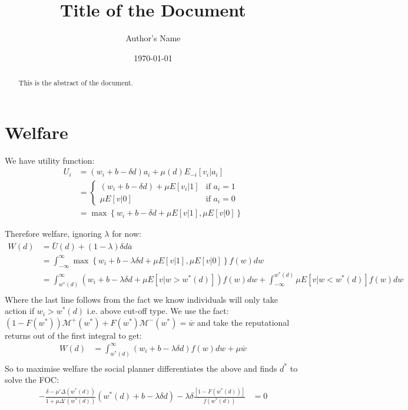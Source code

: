 \documentclass{article}
\begin{document}
\title{Title of the Document}
\author{Author's Name}
\date{\today}

\maketitle

\begin{abstract}
This is the abstract of the document.
\end{abstract}

\section{Welfare}
We have utility function:
\begin{align*}
    U_i &= (w_i + b - \delta d) a_i + \mu(d) E_{-i}\left[v_i | a_i\right] \\
    &= \begin{cases}
        (w_i + b- \delta d) + \mu E \left[v_i | 1\right] & \text{if } a_i = 1 \\
        \mu E \left[v | 0\right] & \text{if } a_i = 0
    \end{cases} \\
    &= \max \left\{w_i + b - \delta d + \mu E\left[v | 1\right],
    \mu E\left[v | 0\right]
      \right\} 
\end{align*}

Therefore welfare, ignoring $\lambda$ for now:
\begin{align*}
    W(d) &= \bar{U}(d) + (1 - \lambda) \delta d \overline{a} \\
    &= \int_{-\infty}^{\infty} \max \left\{w_i + b - \lambda \delta d + \mu E\left[v | 1\right], \mu E\left[v | 0\right] \right\} f(w) dw \\ 
    &= \int^{\infty}_{w^*(d)} (w_i + b - \lambda \delta d + \mu E\left[v | w > w^*(d)\right]) f(w) dw + \int^{w^*(d)}_{-\infty} \mu E\left[v | w < w^*(d)\right] f(w) dw \\
\end{align*}
Where the last line follows from the fact we know individuals will only take action if $w_i > w^*(d)$ i.e. above cut-off type.
We use the fact: $(1 - F(w^*)) \mathcal{M}^+(w^*) + F(w^*)\mathcal{M}^-(w^*) = \overline{w}$ and take the 
reputational returns out of the first integral to get:
\begin{align*}
    W(d) &= \int^{\infty}_{w^*(d)} (w_i + b - \lambda \delta d) f(w) dw +  \mu \overline{w} \\
\end{align*}
So to maximise welfare the social planner differentiates the above and finds $d^*$ to 
solve the FOC:
\begin{align*}
    - \frac{\delta - \mu' \Delta(w^*(d))}{1 + \mu \Delta'(w^*(d))} (w^*(d) + b - \lambda \delta d) - 
    \lambda \delta \frac{\left[1 - F(w^*(d))\right]}{f(w^*(d))} &= 0
\end{align*}
\end{document}
